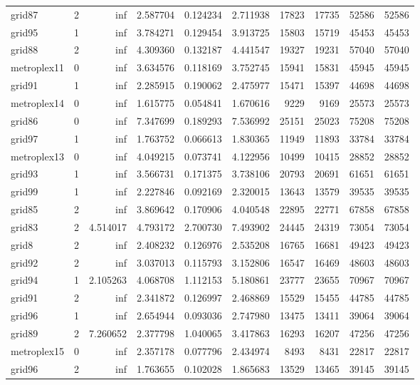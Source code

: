 \begin{longtable}{|l|r|r|r|r|r|r|r|r|r|}
grid87 & 2 & inf & 2.587704 & 0.124234 & 2.711938 & 17823 & 17735 & 52586 & 52586 \\
grid95 & 1 & inf & 3.784271 & 0.129454 & 3.913725 & 15803 & 15719 & 45453 & 45453 \\
grid88 & 2 & inf & 4.309360 & 0.132187 & 4.441547 & 19327 & 19231 & 57040 & 57040 \\
metroplex11 & 0 & inf & 3.634576 & 0.118169 & 3.752745 & 15941 & 15831 & 45945 & 45945 \\
grid91 & 1 & inf & 2.285915 & 0.190062 & 2.475977 & 15471 & 15397 & 44698 & 44698 \\
metroplex14 & 0 & inf & 1.615775 & 0.054841 & 1.670616 & 9229 & 9169 & 25573 & 25573 \\
grid86 & 0 & inf & 7.347699 & 0.189293 & 7.536992 & 25151 & 25023 & 75208 & 75208 \\
grid97 & 1 & inf & 1.763752 & 0.066613 & 1.830365 & 11949 & 11893 & 33784 & 33784 \\
metroplex13 & 0 & inf & 4.049215 & 0.073741 & 4.122956 & 10499 & 10415 & 28852 & 28852 \\
grid93 & 1 & inf & 3.566731 & 0.171375 & 3.738106 & 20793 & 20691 & 61651 & 61651 \\
grid99 & 1 & inf & 2.227846 & 0.092169 & 2.320015 & 13643 & 13579 & 39535 & 39535 \\
grid85 & 2 & inf & 3.869642 & 0.170906 & 4.040548 & 22895 & 22771 & 67858 & 67858 \\
grid83 & 2 & 4.514017 & 4.793172 & 2.700730 & 7.493902 & 24445 & 24319 & 73054 & 73054 \\
grid8 & 2 & inf & 2.408232 & 0.126976 & 2.535208 & 16765 & 16681 & 49423 & 49423 \\
grid92 & 2 & inf & 3.037013 & 0.115793 & 3.152806 & 16547 & 16469 & 48603 & 48603 \\
grid94 & 1 & 2.105263 & 4.068708 & 1.112153 & 5.180861 & 23777 & 23655 & 70967 & 70967 \\
grid91 & 2 & inf & 2.341872 & 0.126997 & 2.468869 & 15529 & 15455 & 44785 & 44785 \\
grid96 & 1 & inf & 2.654944 & 0.093036 & 2.747980 & 13475 & 13411 & 39064 & 39064 \\
grid89 & 2 & 7.260652 & 2.377798 & 1.040065 & 3.417863 & 16293 & 16207 & 47256 & 47256 \\
metroplex15 & 0 & inf & 2.357178 & 0.077796 & 2.434974 & 8493 & 8431 & 22817 & 22817 \\
grid96 & 2 & inf & 1.763655 & 0.102028 & 1.865683 & 13529 & 13465 & 39145 & 39145 \\

\end{longtable}

